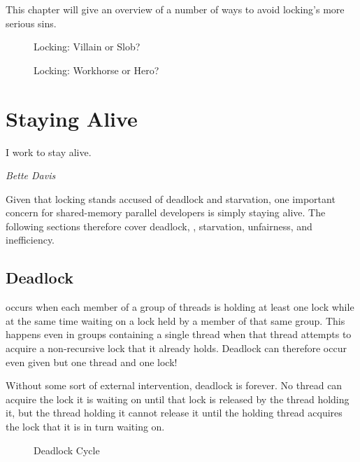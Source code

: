 This chapter will give an overview of a number of ways to avoid locking's
more serious sins.

\begin{figure}
\centering
{}
\caption{Locking: Villain or Slob?}
\end{figure}

\begin{figure}
\centering
{}
\caption{Locking: Workhorse or Hero?}
\end{figure}

\section{Staying Alive}
\label{sec:locking:Staying Alive}
%
\epigraph{I work to stay alive.}{\emph{Bette Davis}}

Given that locking stands accused of deadlock and starvation,
one important concern for shared-memory parallel developers is
simply staying alive.
The following sections therefore cover deadlock, , starvation,
unfairness, and inefficiency.

\subsection{Deadlock}
\label{sec:locking:Deadlock}

 occurs when each member of a group of threads is holding at
least one lock while at the same time waiting on a lock held by a member
of that same group.
This happens even in groups containing a single thread when that thread
attempts to acquire a non-recursive lock that it already holds.
Deadlock can therefore occur even given but one thread and one lock!

Without some sort of external intervention, deadlock is forever.
No thread can acquire the lock it is waiting on until that
lock is released by the thread holding it, but the thread holding
it cannot release it until the holding thread acquires the lock that
it is in turn waiting on.

\begin{figure}
\centering
{}
\caption{Deadlock Cycle}
\label{fig:locking:Deadlock Cycle}
\end{figure}

